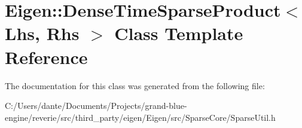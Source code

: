 \hypertarget{class_eigen_1_1_dense_time_sparse_product}{}\section{Eigen\+::Dense\+Time\+Sparse\+Product$<$ Lhs, Rhs $>$ Class Template Reference}
\label{class_eigen_1_1_dense_time_sparse_product}


The documentation for this class was generated from the following file\+:\begin{DoxyCompactItemize}
\item 
C\+:/\+Users/dante/\+Documents/\+Projects/grand-\/blue-\/engine/reverie/src/third\+\_\+party/eigen/\+Eigen/src/\+Sparse\+Core/Sparse\+Util.\+h\end{DoxyCompactItemize}
